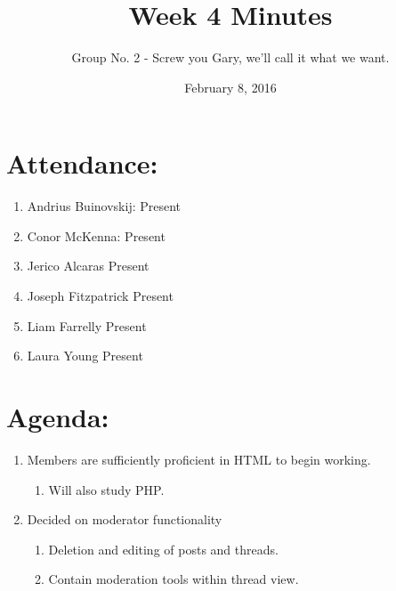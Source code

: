 \documentclass[a4paper, 12pt]{article}
\begin{document}
\title{Week 4 Minutes}
\author{Group No. 2 - Screw you Gary, we'll call it what we want.}
\date{February 8, 2016}
\maketitle

	\section{Attendance:}
		\begin{enumerate}[label*=\arabic*.]
			\item Andrius Buinovskij:	\dotfill Present
			\item Conor McKenna:		\dotfill Present
			\item Jerico Alcaras		\dotfill Present
			\item Joseph Fitzpatrick	\dotfill Present
			\item Liam Farrelly		\dotfill Present
			\item Laura Young		\dotfill Present
		\end{enumerate}

	\section{Agenda:}
		\begin{enumerate}[label*=\arabic*.]
			\item Members are sufficiently proficient in HTML to begin working.
			\begin{enumerate}[label*=\arabic*.]
				\item Will also study PHP.
			\end{enumerate}
			\item Decided on moderator functionality
			\begin{enumerate}[label*=\arabic*.]
				\item Deletion and editing of posts and threads.
				\item Contain moderation tools within thread view.
			\end{enumerate}
		\end{enumerate}

	\newpage
\end{document}
